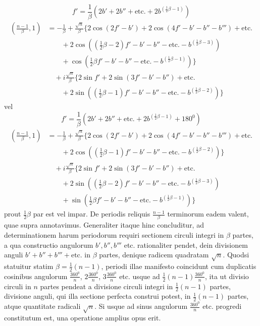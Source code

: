 \[
f'=\frac1\beta(2b'+2b''+\text{etc.}+2b^{(\frac12\beta-1)})
\]
\[
\begin{aligned}
\left(\frac{n-1}\beta,1\right)&=-\frac1\beta+\frac{\surd n}\beta\{2\cos(2f'-b')+2\cos(4f'-b'-b''-b''')+\text{etc.}\\
&\qquad+2\cos((\tfrac12\beta-2)f'-b'-b''-\text{etc.}-b^{(\frac12\beta-3)})\\
&\qquad+\cos(\tfrac12\beta f'-b'-b''-\text{etc.}-b^{(\frac12\beta-1)})\}\\
&\quad+i\frac{\surd n}\beta\{2\sin f'+2\sin(3f'-b'-b'')+\text{etc.}\\
&\qquad+2\sin((\tfrac12\beta-1)f'-b'-b''-\text{etc.}-b^{(\frac12\beta-2)})\}
\end{aligned}
\]
vel
\[
f'=\frac1\beta(2b'+2b''+\text{etc.}+2b^{(\frac12\beta-1)}+180^0)
\]
\[
\begin{aligned}
\left(\frac{n-1}\beta,1\right)&=-\frac1\beta+\frac{\surd n}\beta\{2\cos(2f'-b')+2\cos(4f'-b'-b''-b''')+\text{etc.}\\
&\qquad+2\cos((\tfrac12\beta-1)f'-b'-b''-\text{etc.}-b^{(\frac12\beta-2)})\}\\
&\quad+i\frac{\surd n}\beta\{2\sin f'+2\sin(3f'-b'-b'')+\text{etc.}\\
&\qquad+2\sin((\tfrac12\beta-2)f'-b'-b''-\text{etc.}-b^{(\frac12\beta-3)})\\
&\qquad+\sin(\tfrac12\beta f'-b'-b''-\text{etc.}-b^{(\frac12\beta-1)})\}
\end{aligned}
\]
prout $\frac12\beta$ par est vel impar. De periodis reliquis $\frac{n-1}\beta$ terminorum eadem valent, quae supra annotavimus. Generaliter itaque hinc concluditur, ad determinationem harum periodorum requiri sectionem circuli integri in $\beta$ partes, a qua
constructio angulorum $b',b'',b'''$ etc. rationaliter pendet, dein divisionem anguli $b'+b''+b'''+\text{etc.}$ in $\beta$ partes, denique radicem quadratam $\surd n$. Quodsi statuitur statim $\beta=\frac12(n-1)$, periodi illae manifesto coincidunt cum duplicatis cosinibus angulorum $\frac{360^0}n$, $2\frac{360^0}n$, $3\frac{360^0}n$ etc. usque ad $\frac12(n-1)\frac{360^0}n$, ita ut divisio circuli in $n$ partes pendeat a divisione circuli integri in $\frac12(n-1)$ partes, divisione anguli, qui illa sectione perfecta construi potest, in $\frac12(n-1)$ partes, atque quantitate radicali $\surd n$. Si usque ad sinus angulorum $\frac{360^0}n$ etc. progredi constitutum est, una operatione amplius opus erit.

